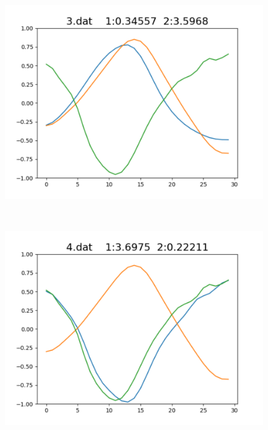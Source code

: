 \begin{figure}[h]
\begin{minipage}[b]{0.32\linewidth}
  \includegraphics[keepaspectratio, scale=0.3]
  {./pic/level1/3_dat.pdf}
  \label{3dat}
 \end{minipage}\\
 \begin{minipage}[b]{0.32\linewidth}
  \centering
  \includegraphics[keepaspectratio, scale=0.3]
  {./pic/level1/4_dat.pdf}
  \label{4dat}
 \end{minipage}
 \begin{minipage}[b]{0.32\linewidth}
  \centering

\end{minipage}
\end{figure}
